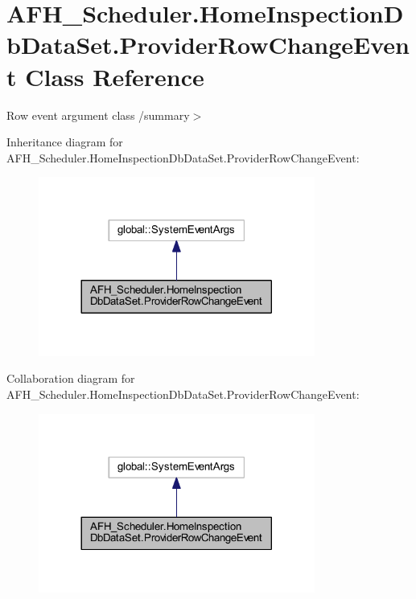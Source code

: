 \section{A\+F\+H\+\_\+\+Scheduler.\+Home\+Inspection\+Db\+Data\+Set.\+Provider\+Row\+Change\+Event Class Reference}
\label{class_a_f_h___scheduler_1_1_home_inspection_db_data_set_1_1_provider_row_change_event}


Row event argument class /summary$>$  




Inheritance diagram for A\+F\+H\+\_\+\+Scheduler.\+Home\+Inspection\+Db\+Data\+Set.\+Provider\+Row\+Change\+Event\+:
\nopagebreak
\begin{figure}[H]
\begin{center}
\leavevmode
\includegraphics[width=257pt]{class_a_f_h___scheduler_1_1_home_inspection_db_data_set_1_1_provider_row_change_event__inherit__graph}
\end{center}
\end{figure}


Collaboration diagram for A\+F\+H\+\_\+\+Scheduler.\+Home\+Inspection\+Db\+Data\+Set.\+Provider\+Row\+Change\+Event\+:
\nopagebreak
\begin{figure}[H]
\begin{center}
\leavevmode
\includegraphics[width=257pt]{class_a_f_h___scheduler_1_1_home_inspection_db_data_set_1_1_provider_row_change_event__coll__graph}
\end{center}
\end{figure}
